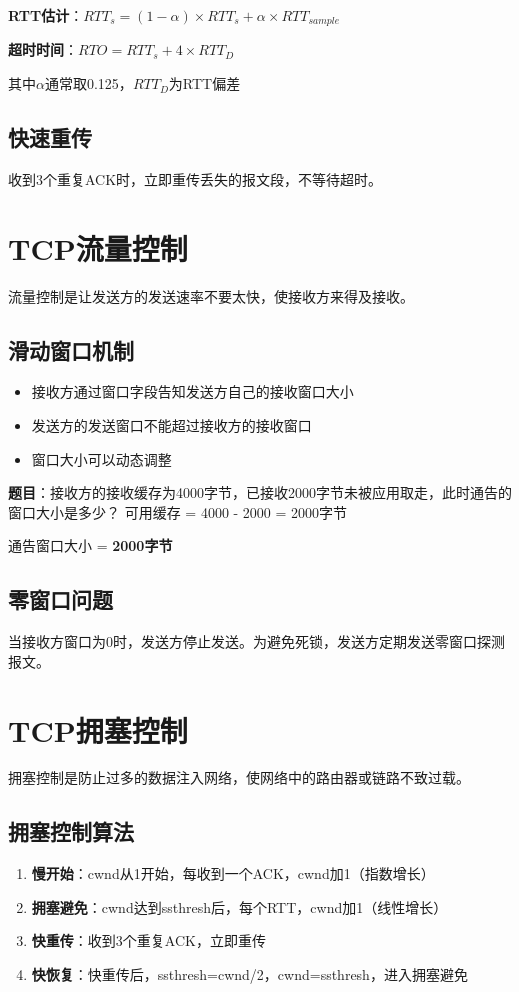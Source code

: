 \begin{formulabox}
\textbf{RTT估计}：$RTT_s = (1-\alpha) \times RTT_s + \alpha \times RTT_{sample}$

\textbf{超时时间}：$RTO = RTT_s + 4 \times RTT_D$

其中$\alpha$通常取0.125，$RTT_D$为RTT偏差
\end{formulabox}

\subsection{快速重传}
收到3个重复ACK时，立即重传丢失的报文段，不等待超时。

\section{TCP流量控制}
流量控制是让发送方的发送速率不要太快，使接收方来得及接收。

\subsection{滑动窗口机制}
\begin{itemize}[leftmargin=2em,itemsep=0pt]
    \item 接收方通过窗口字段告知发送方自己的接收窗口大小
    \item 发送方的发送窗口不能超过接收方的接收窗口
    \item 窗口大小可以动态调整
\end{itemize}

\begin{examplebox}[例题5.2 流量控制]
\textbf{题目}：接收方的接收缓存为4000字节，已接收2000字节未被应用取走，此时通告的窗口大小是多少？
\tcblower
可用缓存 = 4000 - 2000 = 2000字节

通告窗口大小 = \textbf{2000字节}
\end{examplebox}

\subsection{零窗口问题}
当接收方窗口为0时，发送方停止发送。为避免死锁，发送方定期发送零窗口探测报文。

\section{TCP拥塞控制}
拥塞控制是防止过多的数据注入网络，使网络中的路由器或链路不致过载。

\subsection{拥塞控制算法}
\begin{enumerate}[leftmargin=2em,itemsep=0pt]
    \item \textbf{慢开始}：cwnd从1开始，每收到一个ACK，cwnd加1（指数增长）
    \item \textbf{拥塞避免}：cwnd达到ssthresh后，每个RTT，cwnd加1（线性增长）
    \item \textbf{快重传}：收到3个重复ACK，立即重传
    \item \textbf{快恢复}：快重传后，ssthresh=cwnd/2，cwnd=ssthresh，进入拥塞避免
\end{enumerate}

